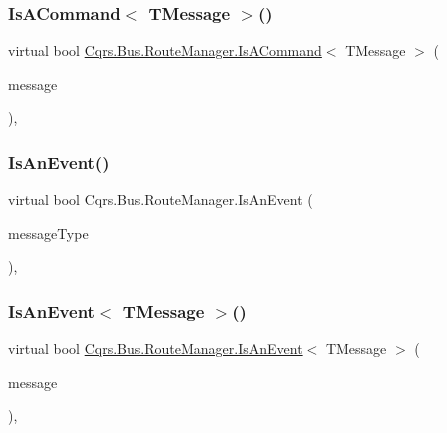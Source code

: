 \subsubsection{\texorpdfstring{Is\+A\+Command$<$ T\+Message $>$()}{IsACommand< TMessage >()}}
{\footnotesize\ttfamily virtual bool \hyperlink{classCqrs_1_1Bus_1_1RouteManager_a7b7bfc4db30cc5956c4acd6a342e9159_a7b7bfc4db30cc5956c4acd6a342e9159}{Cqrs.\+Bus.\+Route\+Manager.\+Is\+A\+Command}$<$ T\+Message $>$ (\begin{DoxyParamCaption}\item[{T\+Message}]{message }\end{DoxyParamCaption})\hspace{0.3cm}{\ttfamily [protected]}, {\ttfamily [virtual]}}

\mbox{\label{classCqrs_1_1Bus_1_1RouteManager_a7b9b2ad8b9f5d7761b0f45c033b96101_a7b9b2ad8b9f5d7761b0f45c033b96101}} 
\subsubsection{\texorpdfstring{Is\+An\+Event()}{IsAnEvent()}}
{\footnotesize\ttfamily virtual bool Cqrs.\+Bus.\+Route\+Manager.\+Is\+An\+Event (\begin{DoxyParamCaption}\item[{Type}]{message\+Type }\end{DoxyParamCaption})\hspace{0.3cm}{\ttfamily [protected]}, {\ttfamily [virtual]}}

\mbox{\label{classCqrs_1_1Bus_1_1RouteManager_a7e5099741cd4b3e538599c771581a4b6_a7e5099741cd4b3e538599c771581a4b6}} 
\subsubsection{\texorpdfstring{Is\+An\+Event$<$ T\+Message $>$()}{IsAnEvent< TMessage >()}}
{\footnotesize\ttfamily virtual bool \hyperlink{classCqrs_1_1Bus_1_1RouteManager_a7b9b2ad8b9f5d7761b0f45c033b96101_a7b9b2ad8b9f5d7761b0f45c033b96101}{Cqrs.\+Bus.\+Route\+Manager.\+Is\+An\+Event}$<$ T\+Message $>$ (\begin{DoxyParamCaption}\item[{T\+Message}]{message }\end{DoxyParamCaption})\hspace{0.3cm}{\ttfamily [protected]}, {\ttfamily [virtual]}}

